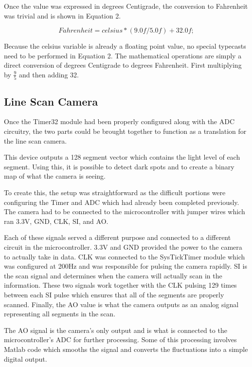\documentclass[conference]{IEEEtran}
\begin{document}
Once the value was expressed in degrees Centigrade, the conversion to Fahrenheit was trivial and is shown in Equation 2.

\begin{equation}
    Fahrenheit = celsius * (9.0f/5.0f) + 32.0f;
\end{equation}

Because the celsius variable is already a floating point value, no special typecasts need to be performed in Equation 2. The mathematical operations are simply a direct conversion of degrees Centigrade to degrees Fahrenheit. First multiplying by $\frac{9}{5}$ and then adding 32.


\subsection{Line Scan Camera}
Once the Timer32 module had been properly configured along with the ADC circuitry, the two parts could be brought together to function as a translation for the line scan camera.

This device outputs a 128 segment vector which contains the light level of each segment. Using this, it is possible to detect dark spots and to create a binary map of what the camera is seeing.

To create this, the setup was straightforward as the difficult portions were configuring the Timer and ADC which had already been completed previously. The camera had to be connected to the microcontroller with jumper wires which ran 3.3V, GND, CLK, SI, and AO.

Each of these signals served a different purpose and connected to a different circuit in the microcontroller. 3.3V and GND provided the power to the camera to actually take in data. CLK was connected to the SysTickTimer module which was configured at 200Hz and was responsible for pulsing the camera rapidly. SI is the scan signal and determines when the camera will actually scan in the information. These two signals work together with the CLK pulsing 129 times between each SI pulse which ensures that all of the segments are properly scanned. Finally, the AO value is what the camera outputs as an analog signal representing all segments in the scan.

The AO signal is the camera's only output and is what is connected to the microcontroller's ADC for further processing. Some of this processing involves Matlab code which smooths the signal and converts the fluctuations into a simple digital output.
\end{document}
